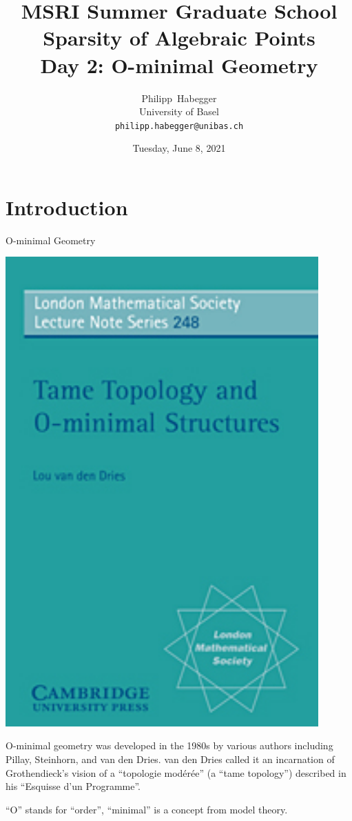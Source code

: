 \documentclass{beamer}
\title{MSRI Summer Graduate School \\ Sparsity of Algebraic Points \\
  Day 2: O-minimal Geometry}
\author{Philipp~Habegger \\ University of Basel \\ \texttt{philipp.habegger@unibas.ch}}
\date{Tuesday, June 8, 2021}
\begin{document}
\setlength{\abovecaptionskip}{0pt} 
\setlength{\belowcaptionskip}{0pt} 

\renewcommand{\figurename}{Fig.}


\begin{frame}
  \titlepage
\end{frame}

\section{Introduction}
\begin{frame}{O-minimal Geometry}
  \begin{minipage}{0.3\linewidth}
    \includegraphics[width=0.9\textwidth]{vddries_title.jpg}    
  \end{minipage}\begin{minipage}{0.6\linewidth}
    O-minimal geometry was developed in the 1980s by various authors
    including Pillay, Steinhorn, and van den Dries. van den Dries called it an
    incarnation of Grothendieck's vision of a ``topologie
    mod\'er\'ee'' (a ``tame topology'') described
    in his ``Esquisse d'un Programme''.  
  \end{minipage}

  ``O'' stands for ``order'',  ``minimal'' is a concept from model
  theory.
\end{frame}
\end{document}
